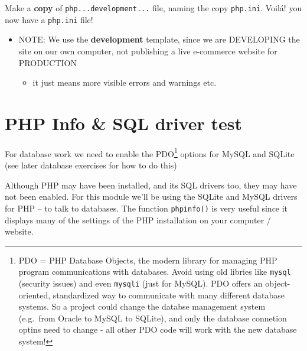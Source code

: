 \documentclass[a4paperpaper,openright]{book}
\providecommand{\tightlist}{%
  \setlength{\itemsep}{0pt}\setlength{\parskip}{0pt}}
\begin{document}
Make a \textbf{copy} of \texttt{php...development...} file, naming the
copy \texttt{php.ini}. Voilá! you now have a \texttt{php.ini} file!

\begin{itemize}
\item
  NOTE: We use the \textbf{development} template, since we are
  DEVELOPING the site on our own computer, not publishing a live
  e-commerce website for PRODUCTION

  \begin{itemize}
  \tightlist
  \item
    it just means more visible errors and warnings etc.
  \end{itemize}
\end{itemize}

\hypertarget{php-info-sql-driver-test}{%
\section{PHP Info \& SQL driver test}\label{php-info-sql-driver-test}}

For database work we need to enable the PDO\footnote{PDO = PHP Database
  Objects, the modern library for managing PHP program communications
  with databases. Avoid using old libries like \texttt{mysql} (security
  issues) and even \texttt{mysqli} (just for MySQL). PDO offers an
  object-oriented, standardized way to communicate with many different
  database systems. So a project could change the databse management
  system (e.g.~from Oracle to MySQL to SQLite), and only the database
  connetion optins need to change - all other PDO code will work with
  the new database system!} options for MySQL and SQLite (see later
database exercises for how to do this)

Although PHP may have been installed, and its SQL drivers too, they may
have not been enabled. For this module we'll be using the SQLite and
MySQL drivers for PHP -- to talk to databases. The function
\texttt{phpinfo()} is very useful since it displays many of the settings
of the PHP installation on your computer / website.
\end{document}

